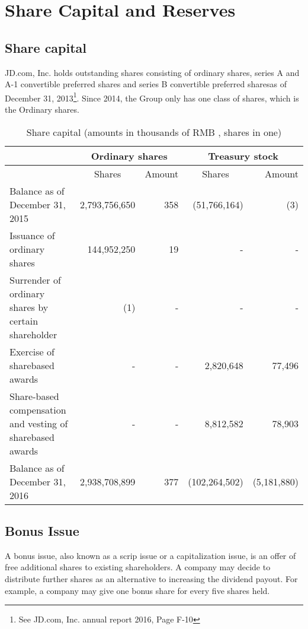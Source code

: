 \section{Share Capital and Reserves}

\subsection{Share capital}

JD.com, Inc. holds outstanding shares consisting of ordinary shares, series A and A-1 convertible preferred shares and series B convertible preferred sharesas of December 31, 2013\footnote{See JD.com, Inc. annual report 2016, Page F-10}. Since 2014, the Group only has one class of shares, which is the Ordinary shares.

\begin{table}[H]	
	\begin{center}
		\begin{tabular}{|p{5.6cm}|r|r|r|r|}\hline
			&\multicolumn{2}{c|}{\textbf{Ordinary shares}}&\multicolumn{2}{c|}{\textbf{Treasury stock}}\\
			\hline
			&\multicolumn{1}{c|}{Shares}&Amount&\multicolumn{1}{c|}{Shares}&Amount\\
			\hline
		\rowcolor[gray]{.95}	
		Balance as of
		December 31,
		2015&2,793,756,650&358&(51,766,164)&(3)\\
		Issuance of ordinary shares&144,952,250&19&-&-\\
		\rowcolor[gray]{.95}
		Surrender of ordinary shares by certain	shareholder&(1)&-&-&-\\
		Exercise of sharebased	awards&-&-&2,820,648&77,496\\
		\rowcolor[gray]{.95}
		Share-based	compensation and vesting of sharebased	awards&-&-&8,812,582&78,903\\
		Balance as of December 31, 2016&2,938,708,899&377&(102,264,502)&(5,181,880)\\
			\hline
		\end{tabular}
	\end{center}
	\caption{Share capital (amounts in thousands of RMB \textyen, shares in one)}\label{table:1}
\end{table}



\subsection{Bonus Issue}
A bonus issue, also known as a scrip issue or a capitalization issue, is an offer of free additional shares to existing shareholders. A company may decide to distribute further shares as an alternative to increasing the dividend payout. For example, a company may give one bonus share for every five shares held.

